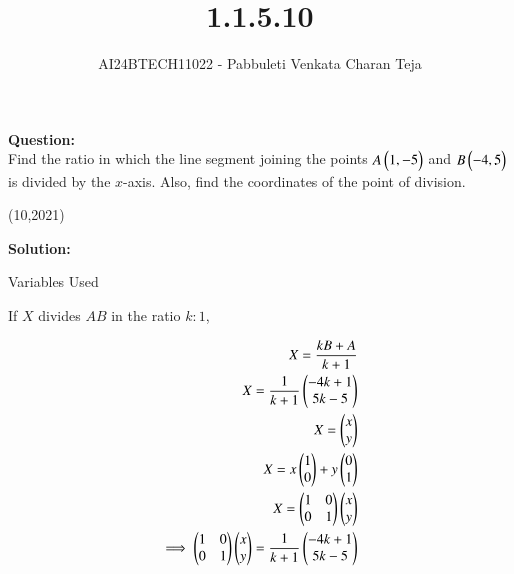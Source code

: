 \documentclass[journal]{IEEEtran}
\begin{document}

\vspace{3cm}

\title{1.1.5.10}
\author{AI24BTECH11022 - Pabbuleti Venkata Charan Teja}
\maketitle

\renewcommand{\thefigure}{\theenumi}
\renewcommand{\thetable}{\theenumi}

\textbf{Question:}\\
Find the ratio in which the line segment joining the points $A\begin{pmatrix}1,-5\end{pmatrix}$ and $B\begin{pmatrix}-4,5\end{pmatrix}$ is divided by the $x$-axis. Also, find the coordinates of the point of division.

\hfill{(10,2021)}

\textbf{Solution:}

\begin{table}[h!]
\renewcommand{\thetable}{1}
    \centering
   
   \def\tablename{Table}
   \caption{Variables Used}
    \label{tab1.1.5.10.1}
\end{table}
If $X$ divides $AB$ in the ratio $k:1$,

\begin{align}
X=\frac{kB+A}{k+1} \label{eq1.1.5.10.1} \\
X=\frac{1}{k+1}
\begin{pmatrix}
-4k+1 \\
5k-5 \\
\end{pmatrix} \label{eq1.1.5.10.2} \\
X=
\begin{pmatrix}
x \\
y \\
\end{pmatrix} \\
X=x\begin{pmatrix}1 \\ 0 \\\end{pmatrix}+y\begin{pmatrix}0 \\ 1 \\\end{pmatrix} \label{eq1.1.5.10.3}\\
X=
\begin{pmatrix}
1 & 0 \\
0 & 1 \\
\end{pmatrix}
\begin{pmatrix}
x \\
y \\
\end{pmatrix}\label{eq1.1.5.10.4} \\
\implies
\begin{pmatrix}
1 & 0 \\
0 & 1 \\
\end{pmatrix}
\begin{pmatrix}
x \\
y \\
\end{pmatrix}
=\frac{1}{k+1}
\begin{pmatrix}
-4k+1 \\
5k-5 \\
\end{pmatrix} \label{eq1.1.5.10.5}
\end{align}
\end{document}
